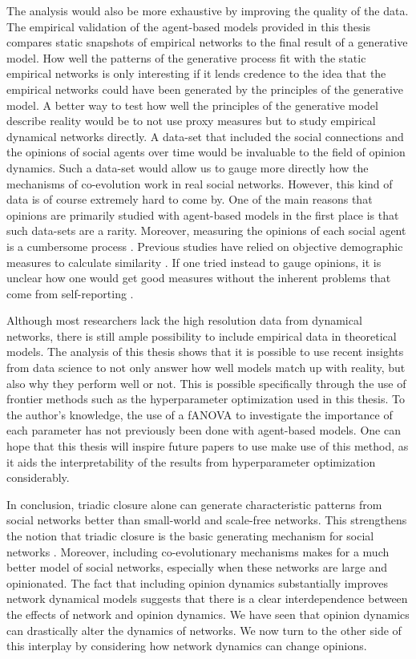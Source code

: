 \documentclass[11pt]{article}
\begin{document}
The analysis would also be more exhaustive by improving the quality of the data. The empirical validation of the agent-based models provided in this thesis compares static snapshots of empirical networks to the final result of a generative model. How well the patterns of the generative process fit with the static empirical networks is only interesting if it lends credence to the idea that the empirical networks could have been generated by the principles of the generative model. 
A better way to test how well the principles of the generative model describe reality would be to not use proxy measures but to study empirical dynamical networks directly. A data-set that included the social connections and the opinions of social agents over time would be invaluable to the field of opinion dynamics. Such a data-set would allow us to gauge more directly how the mechanisms of co-evolution work in real social networks. 
However, this kind of data is of course extremely hard to come by. One of the main reasons that opinions are primarily studied with agent-based models in the first place is that such data-sets are a rarity. Moreover, measuring the opinions of each social agent is a cumbersome process \cite{chartishvili2019approach}. Previous studies have relied on objective demographic measures to calculate similarity \cite{kossinets_origins_2009, bener_empirical_2016}. If one tried instead to gauge opinions, it is unclear how one would get good measures without the inherent problems that come from self-reporting \cite{best2007measuring}. 

Although most researchers lack the high resolution data from dynamical networks, there is still ample possibility to include empirical data in theoretical models. 
The analysis of this thesis shows that it is possible to use recent insights from data science to not only answer how well models match up with reality, but also why they perform well or not. 
This is possible specifically through the use of frontier methods such as the hyperparameter optimization used in this thesis. To the author's knowledge, the use of a fANOVA to investigate the importance of each parameter has not previously been done with agent-based models.
One can hope that this thesis will inspire future papers to use make use of this method, as it aids the interpretability of the results from hyperparameter optimization considerably. 

\noindent In conclusion, triadic closure alone can generate characteristic patterns from social networks better than small-world and scale-free networks. This strengthens the notion that triadic closure is the basic generating mechanism for social networks \cite{ilany_social_2016,jacksonmeeting2007, jacksonsearch2004}. Moreover, including co-evolutionary mechanisms makes for a much better model of social networks, especially when these networks are large and opinionated. 
The fact that including opinion dynamics substantially improves network dynamical models suggests that there is a clear interdependence between the effects of network and opinion dynamics. We have seen that opinion dynamics can drastically alter the dynamics of networks. We now turn to the other side of this interplay by considering how network dynamics can change opinions.
\end{document}
